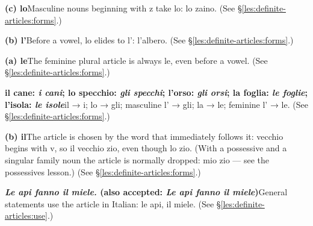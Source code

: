 \documentclass[11pt,a4paper,twoside,openright]{book}
\newcommand{\answerheading}[1]{\par\medskip\noindent{\sffamily\bfseries\small #1}\par\nopagebreak}
\begin{document}
\answerheading{\S\ref{les:definite-articles} The definite article}\label{ans:definite-articles}
\begin{answers}
\item\relax \textbf{(c) lo}\newline Masculine nouns beginning with z take lo: lo zaino. {\color{muted}(See \S\ref{les:definite-articles:forms}.)}
\item\relax \textbf{(b) l'}\newline Before a vowel, lo elides to l': l'albero. {\color{muted}(See \S\ref{les:definite-articles:forms}.)}
\item\relax \textbf{(a) le}\newline The feminine plural article is always le, even before a vowel. {\color{muted}(See \S\ref{les:definite-articles:forms}.)}
\item\relax \textbf{il cane: \textit{i cani}; lo specchio: \textit{gli specchi}; l'orso: \textit{gli orsi}; la foglia: \textit{le foglie}; l'isola: \textit{le isole}}\newline il → i; lo → gli; masculine l' → gli; la → le; feminine l' → le. {\color{muted}(See \S\ref{les:definite-articles:forms}.)}
\item\relax \textbf{(b) il}\newline The article is chosen by the word that immediately follows it: vecchio begins with v, so il vecchio zio, even though lo zio. (With a possessive and a singular family noun the article is normally dropped: mio zio — see the possessives lesson.) {\color{muted}(See \S\ref{les:definite-articles:forms}.)}
\item\relax \textbf{\textit{Le api fanno il miele.} {\color{muted}(also accepted: \textit{Le api fanno il miele})}}\newline General statements use the article in Italian: le api, il miele. {\color{muted}(See \S\ref{les:definite-articles:use}.)}
\end{answers}
\end{document}
